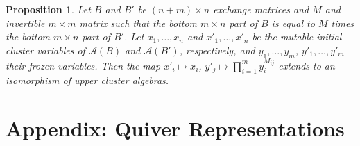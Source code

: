 \documentclass[11pt]{amsart}
\newcommand{\cA}{\mathcal{A}}
\newtheorem{proposition}[theorem]{Proposition}
\numberwithin{equation}{section}
\begin{document}
\begin{proposition}\label{prop:changeofcoeffs}
Let $B$ and $B'$ be $(n+m)\times n$ exchange matrices and $M$ and invertible $m \times m$ matrix such that the bottom $m \times n$ part of $B$ is equal to $M$ times the bottom $m \times n$ part of $B'$.  Let $x_1,\dotsc,x_n$ and $x'_1,\dotsc,x'_n$ be the mutable initial cluster variables of $\cA(B)$ and $\cA(B')$, respectively, and $y_1,\dotsc,y_m$, $y'_1,\dotsc, y'_m$ their frozen variables.  Then the map $x'_i \mapsto x_i$, $y'_j \mapsto \prod_{i=1}^m y_i^{M_{ij}}$ extends to an isomorphism of upper cluster algebras.
\end{proposition}


\section{Appendix: Quiver Representations}
\end{document}
